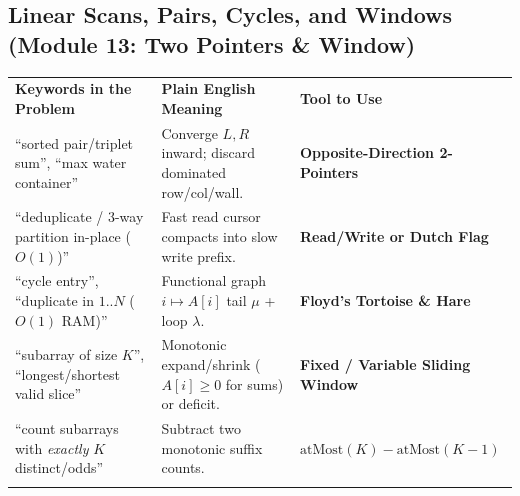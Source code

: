 \documentclass[11pt,a4paper]{article}
\begin{document}
\subsection{Linear Scans, Pairs, Cycles, and Windows (Module 13: Two Pointers \& Window)}
\begingroup\footnotesize{}
\begin{tabularx}{\textwidth}{>{\raggedright\arraybackslash}p{4.4cm} >{\raggedright\arraybackslash}X >{\raggedright\arraybackslash\bfseries}p{4.0cm}}
\arrayrulecolor{primaryblue}\toprule[1.1pt]
\rowcolor{primaryblue!10}
\textcolor{primaryblue}{\textbf{Keywords in the Problem}} & \textcolor{primaryblue}{\textbf{Plain English Meaning}} & \textcolor{primaryblue}{\textbf{Tool to Use}} \\
\arrayrulecolor{codeframe}\midrule[0.6pt]
``sorted pair/triplet sum'', ``max water container'' & Converge $L, R$ inward; discard dominated row/col/wall. & Opposite-Direction 2-Pointers \\
``deduplicate / 3-way partition in-place ($O(1)$)'' & Fast read cursor compacts into slow write prefix. & Read/Write or Dutch Flag \\
``cycle entry'', ``duplicate in $1..N$ ($O(1)$ RAM)'' & Functional graph $i \mapsto A[i]$ tail $\mu$ + loop $\lambda$. & Floyd's Tortoise \& Hare \\
``subarray of size $K$'', ``longest/shortest valid slice'' & Monotonic expand/shrink ($A[i] \ge 0$ for sums) or deficit. & Fixed / Variable Sliding Window \\
``count subarrays with \emph{exactly} $K$ distinct/odds'' & Subtract two monotonic suffix counts. & $\text{atMost}(K) - \text{atMost}(K{-}1)$ \\
\arrayrulecolor{primaryblue}\bottomrule[1.1pt]
\end{tabularx}\endgroup
\end{document}
